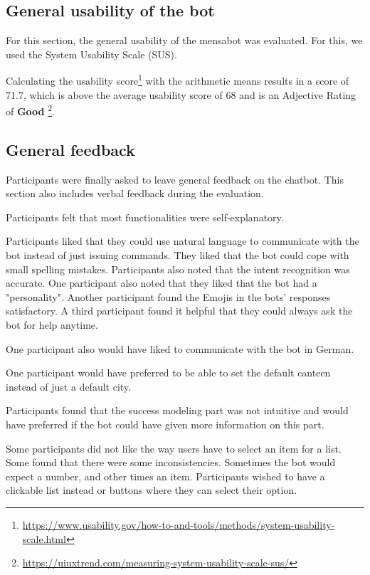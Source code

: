 \subsection{General usability of the bot}
For this section, the general usability of the mensabot was evaluated. For this, we used the System Usability Scale (SUS).

Calculating the usability score\footnote{\label{note1}\url{https://www.usability.gov/how-to-and-tools/methods/system-usability-scale.html}} with the arithmetic means results in a score of 71.7, which is above the average usability score of 68 and is an Adjective Rating of \textbf{Good} \footnote{\url{https://uiuxtrend.com/measuring-system-usability-scale-sus/}}.




\subsection{General feedback}
Participants were finally asked to leave general feedback on the chatbot. This section also includes verbal feedback during the evaluation. 

Participants felt that most functionalities were self-explanatory. 

Participants liked that they could use natural language to communicate with the bot instead of just issuing commands.
They liked that the bot could cope with small spelling mistakes.
Participants also noted that the intent recognition was accurate.
One participant also noted that they liked that the bot had a "personality". Another participant found the Emojis in the bots' responses satisfactory. A third participant found it helpful that they could always ask the bot for help anytime.

One participant also would have liked to communicate with the bot in German.

One participant would have preferred to be able to set the default canteen instead of just a default city. 

Participants found that the success modeling part was not intuitive and would have preferred if the bot could have given more information on this part. 

Some participants did not like the way users have to select an item for a list. Some found that there were some inconsistencies. Sometimes the bot would expect a number, and other times an item. 
Participants wished to have a clickable list instead or buttons where they can select their option.

